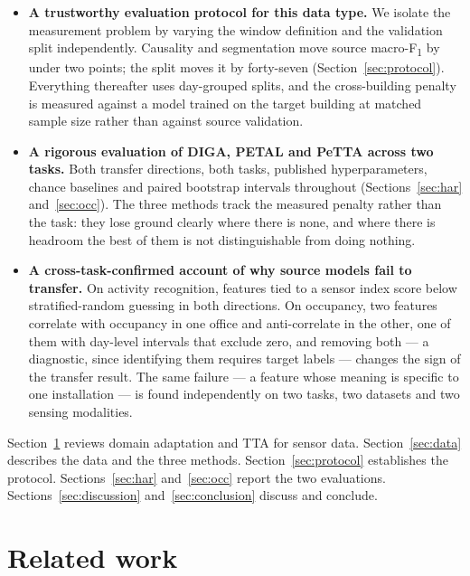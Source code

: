 \documentclass[a4paper,fleqn]{cas-dc}
\newcommand{\macf}{macro-F\textsubscript{1}}
\begin{document}
\begin{itemize}
\item \textbf{A trustworthy evaluation protocol for this data type.} We isolate the
  measurement problem by varying the window definition and the validation split
  independently. Causality and segmentation move source \macf{} by under two points; the
  split moves it by forty-seven (Section~\ref{sec:protocol}). Everything thereafter uses
  day-grouped splits, and the cross-building penalty is measured against a model trained on
  the target building at matched sample size rather than against source validation.

\item \textbf{A rigorous evaluation of DIGA, PETAL and PeTTA across two tasks.} Both
  transfer directions, both tasks, published hyperparameters, chance baselines and paired
  bootstrap intervals throughout (Sections~\ref{sec:har} and~\ref{sec:occ}). The three
  methods track the measured penalty rather than the task: they lose ground clearly where
  there is none, and where there is headroom the best of them is not distinguishable from
  doing nothing.

\item \textbf{A cross-task-confirmed account of why source models fail to transfer.}
  On activity recognition, features tied to a sensor index score below stratified-random
  guessing in both directions. On occupancy, two features correlate with occupancy in one
  office and anti-correlate in the other, one of them with day-level intervals that exclude
  zero, and removing both --- a diagnostic, since identifying them requires target labels
  --- changes the sign of the transfer result.
  The same failure --- a feature whose meaning is specific to one installation --- is found
  independently on two tasks, two datasets and two sensing modalities.
\end{itemize}

Section~\ref{sec:related} reviews domain adaptation and TTA for sensor data.
Section~\ref{sec:data} describes the data and the three methods.
Section~\ref{sec:protocol} establishes the protocol. Sections~\ref{sec:har}
and~\ref{sec:occ} report the two evaluations. Sections~\ref{sec:discussion}
and~\ref{sec:conclusion} discuss and conclude.

\section{Related work}
\label{sec:related}
\end{document}
